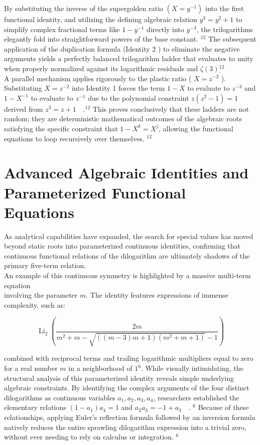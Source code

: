 \documentclass[10pt]{article}
\begin{document}
By substituting the inverse of the supergolden ratio $\left(X=y^{-1}\right)$ into the first functional identity, and utilizing the defining algebraic relation $y^{3}=y^{2}+1$ to simplify complex fractional terms like $1-y^{-1}$ directly into $y^{-3}$, the trilogarithms elegantly fold into straightforward powers of the base constant. ${ }^{12}$ The subsequent application of the duplication formula (Identity 2 ) to eliminate the negative arguments yields a perfectly balanced trilogarithm ladder that evaluates to unity when properly normalized against its logarithmic residuals and $\zeta(3){ }_{.}^{12}$\\
A parallel mechanism applies rigorously to the plastic ratio ( $X=z^{-2}$ ). Substituting $X=z^{-2}$ into Identity 1 forces the term $1-X$ to evaluate to $z^{-3}$ and $1-X^{-1}$ to evaluate to $z^{-1}$ due to the polynomial constraint $z\left(z^{2}-1\right)=1$ derived from $z^{3}=z+1 \quad .^{12}$ This proves conclusively that these ladders are not random; they are deterministic mathematical outcomes of the algebraic roots satisfying the specific constraint that $1-X^{k}=X^{j}$, allowing the functional equations to loop recursively over themselves. ${ }^{12}$

\section*{Advanced Algebraic Identities and Parameterized Functional Equations}
As analytical capabilities have expanded, the search for special values has moved beyond static roots into parameterized continuous identities, confirming that continuous functional relations of the dilogarithm are ultimately shadows of the primary five-term relation.\\
An example of this continuous symmetry is highlighted by a massive multi-term equation\\
involving the parameter $m$. The identity features expressions of immense complexity, such as:

$$
\operatorname{Li}_{2}\left(\frac{2 m}{m^{2}+m-\sqrt{((m-3) m+1)\left(m^{2}+m+1\right)}-1}\right)
$$

combined with reciprocal terms and trailing logarithmic multipliers equal to zero for a real number $m$ in a neighborhood of $1^{6}$. While visually intimidating, the structural analysis of this parameterized identity reveals simple underlying algebraic constraints. By identifying the complex arguments of the four distinct dilogarithms as continuous variables $a_{1}, a_{2}, a_{3}, a_{4}$, researchers established the elementary relations $\left(1-a_{1}\right) a_{4}=1$ and $a_{2} a_{3}=-1+a_{3} \quad$. ${ }^{6}$ Because of these relationships, applying Euler's reflection formula followed by an inversion formula natively reduces the entire sprawling dilogarithm expression into a trivial zero, without ever needing to rely on calculus or integration. ${ }^{6}$
\end{document}
